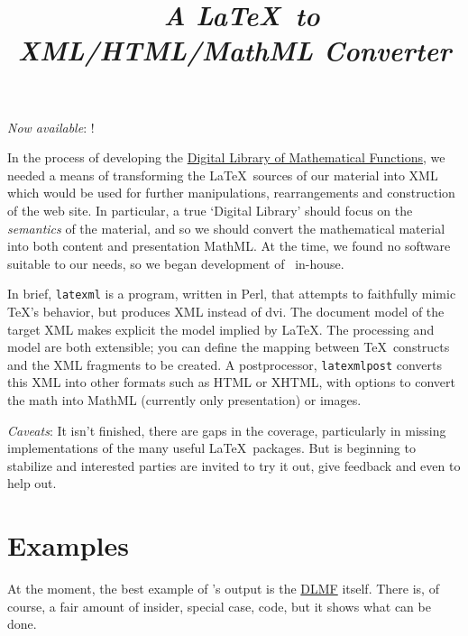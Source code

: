 \documentclass{article}
\title{\LaTeXML\ \emph{A \LaTeX\ to XML/HTML/MathML Converter}}
\begin{document}
\label{top}
\maketitle

\emph{Now available}:  !

In the process of developing the
\href{http://dlmf.nist.gov/}{Digital Library of Mathematical Functions},
we needed a means of transforming
the \LaTeX\ sources of our material into XML which would be used
for further manipulations, rearrangements and construction of the web site.
In particular, a true `Digital Library' should focus on the \emph{semantics}
of the material, and so we should convert the mathematical material into both
content and presentation MathML.
At the time, we found no software suitable to our needs, so we began
development of \LaTeXML\ in-house.  

In brief, \texttt{latexml} is a program, written in Perl, that attempts to
faithfully mimic \TeX's behavior, but produces XML instead of dvi.
The document model of the target XML makes explicit the model implied
by \LaTeX.
The processing and model are both extensible; you can define
the mapping between \TeX\ constructs and the XML fragments to be created.
A postprocessor, \texttt{latexmlpost} converts this
XML into other formats such as HTML or XHTML, with options
to convert the math into MathML (currently only presentation) or images.

\emph{Caveats}: It isn't finished, there are gaps in the coverage,
particularly in missing implementations of the many useful \LaTeX\ packages.
But is beginning to stabilize and interested parties
are invited to try it out, give feedback and even to help out.


\section{Examples}\label{examples}
At the moment, the best example of \LaTeXML's output is 
the \href{http://dlmf.nist.gov/}{DLMF} itself.
There is, of course, a fair amount of insider, special case,
code, but it shows what can be done.
\end{document}
